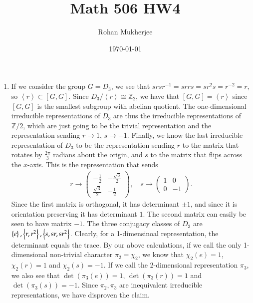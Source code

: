 \documentclass[12pt]{article}
\title{Math 506 HW4}
\date{\today}
\author{Rohan Mukherjee}
\theoremstyle{definitionstyle}
\def\mbb#1{\mathbb{#1}}
\newcommand{\SET}[1]{\Set{\mskip-\medmuskip #1 \mskip-\medmuskip}}
\newcommand{\Z}{\mbb Z}
\newcommand{\gen}[1]{\left\langle #1 \right\rangle}
\begin{document}
    \maketitle
    \begin{enumerate}
        \item If we consider the group $G = D_3$, we see that $srsr^{-1} = srrs = sr^2s = r^{-2} = r$, so $\gen{r} \subset [G,G]$. Since $D_3/\gen{r} \cong \Z_2$, we have that $[G,G] = \gen{r}$ since $[G,G]$ is the smallest subgroup with abelian quotient. The one-dimensional irreducible representations of $D_3$ are thus the irreducible representations of $\Z/2$, which are just going to be the trivial representation and the representation sending $r \to 1$, $s \to -1$. Finally, we know the last irreducible representation of $D_3$ to be the representation sending $r$ to the matrix that rotates by $\frac{2\pi}{3}$ radians about the origin, and $s$ to the matrix that flips across the $x$-axis. This is the representation that sends 
        \begin{align*}
            r \to \begin{pmatrix} -\frac{1}{2} & -\frac{\sqrt{3}}{2} \\ \frac{\sqrt{3}}{2} & -\frac{1}{2} \end{pmatrix}, \quad s \to \begin{pmatrix} 1 & 0 \\ 0 & -1 \end{pmatrix}.
        \end{align*} Since the first matrix is orthogonal, it has determinant $\pm 1$, and since it is orientation preserving it has determinant $1$. The second matrix can easily be seen to have matrix $-1$. The three conjugacy classes of $D_3$ are $\SET{e}, \SET{r, r^2}, \SET{s, sr, sr^2}$. Clearly, for a 1-dimensinoal representation, the determinant equals the trace. By our above calculations, if we call the only 1-dimensional non-trivial character $\pi_2=\chi_2$, we know that $\chi_2(e) = 1$, $\chi_2(r) = 1$ and $\chi_2(s) = -1$. If we call the 2-dimensional representation $\pi_3$, we also see that $\det(\pi_3(e)) = 1$, $\det(\pi_3(r)) = 1$ and $\det(\pi_3(s)) = -1$. Since $\pi_2, \pi_3$ are inequivalent irreducible representations, we have disproven the claim.
        

\end{enumerate}
\end{document}
